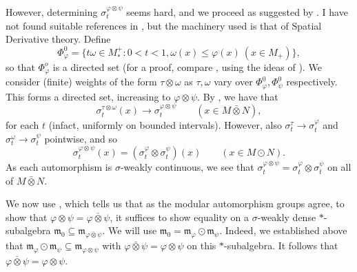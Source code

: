 \documentclass[a4paper,11pt]{article}
\theoremstyle{plain}
\theoremstyle{remark}
\newcommand{\mf}[1]{\mathfrak{#1}}
\newcommand{\vnten}{\bar\otimes}
\begin{document}
However, determining $\sigma_t^{\varphi\otimes\psi}$ seems hard, and we proceed as suggested by \cite{Stratila_ModTheoryBook}.  I have not found suitable references in \cite{TakesakiII}, but the machinery used is that of Spatial Derivative theory.  Define
\[ \Phi^0_\varphi = \{ t\omega\in M_*^+ : 0<t<1, \omega(x) \leq \varphi(x) \ (x\in M_+) \}, \]
so that $\Phi^o_\varphi$ is a directed set (for a proof, compare \cite[Proposition~3.5]{kustermans1997kmsweightscalgebras}, using the ideas of \cite[page~55]{TakesakiII}).  We consider (finite) weights of the form $\tau \otimes \omega$ as $\tau,\omega$ vary over $\Phi^0_\varphi, \Phi^0_\psi$ respectively.  This forms a directed set, increasing to $\varphi\otimes\psi$.  By \cite[Proposition~7.17]{Stratila_ModTheoryBook}, we have that
\[ \sigma_t^{\tau\otimes\omega}(x) \to \sigma_t^{\varphi\otimes\psi} \qquad (x\in M\vnten N), \]
for each $t$ (infact, uniformly on bounded intervals).  However, also $\sigma_t^\tau \to \sigma_t^\varphi$ and $\sigma_t^\omega \to \sigma_t^\psi$ pointwise, and so 
\[ \sigma_t^{\varphi\otimes\psi}(x) = (\sigma_t^\varphi \otimes \sigma_t^\psi)(x)
\qquad (x\in M \odot N). \]
As each automorphism is $\sigma$-weakly continuous, we see that $\sigma_t^{\varphi\otimes\psi} = \sigma_t^\varphi \otimes \sigma_t^\psi$ on all of $M\vnten N$.

We now use \cite[Proposition~VIII.3.16]{TakesakiII}, which tells us that as the modular automorphism groups agree, to show that $\varphi\otimes\psi = \varphi \vnten \psi$, it suffices to show equality on a $\sigma$-weakly dense $*$-subalgebra $\mf m_0 \subseteq \mf m_{\varphi\vnten\psi}$.  We will use $\mf m_0 = \mf m_\varphi \odot \mf m_\psi$.  Indeed, we established above that $\mf m_\varphi \odot \mf m_\psi \subseteq \mf m_{\varphi\otimes\psi}$ with $\varphi\vnten\psi = \varphi\otimes\psi$ on this $*$-subalgebra.  It follows that $\varphi\vnten\psi = \varphi\otimes\psi$.









\end{document}
